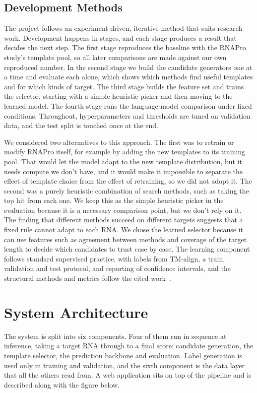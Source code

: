 \documentclass{FastFyp}
\begin{document}
\subsection{Development Methods}
The project follows an experiment-driven, iterative method that suits research work. Development happens in stages, and each stage produces a result that decides the next step. The first stage reproduces the baseline with the RNAPro study's template pool, so all later comparisons are made against our own reproduced number. In the second stage we build the candidate generators one at a time and evaluate each alone, which shows which methods find useful templates and for which kinds of target. The third stage builds the feature set and trains the selector, starting with a simple heuristic picker and then moving to the learned model. The fourth stage runs the language-model comparison under fixed conditions. Throughout, hyperparameters and thresholds are tuned on validation data, and the test split is touched once at the end.

We considered two alternatives to this approach. The first was to retrain or modify RNAPro itself, for example by adding the new templates to its training pool. That would let the model adapt to the new template distribution, but it needs compute we don't have, and it would make it impossible to separate the effect of template choice from the effect of retraining, so we did not adopt it. The second was a purely heuristic combination of search methods, such as taking the top hit from each one. We keep this as the simple heuristic picker in the evaluation because it is a necessary comparison point, but we don't rely on it. The finding that different methods succeed on different targets suggests that a fixed rule cannot adapt to each RNA. We chose the learned selector because it can use features such as agreement between methods and coverage of the target length to decide which candidates to trust case by case. The learning component follows standard supervised practice, with labels from TM-align, a train, validation and test protocol, and reporting of confidence intervals, and the structural methods and metrics follow the cited work~\cite{kalvari2018,nawrocki2013,steinegger2017,leerna}.

\section{System Architecture}
The system is split into six components. Four of them run in sequence at inference, taking a target RNA through to a final score: candidate generation, the template selector, the prediction backbone and evaluation. Label generation is used only in training and validation, and the sixth component is the data layer that all the others read from. A web application sits on top of the pipeline and is described along with the figure below.
\end{document}
